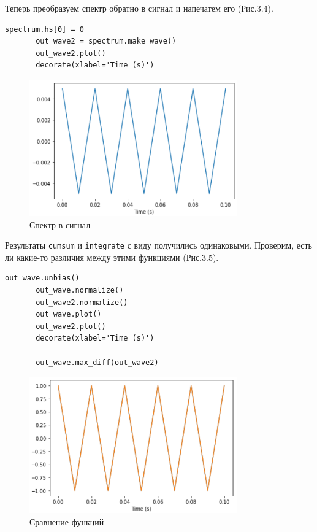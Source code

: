 \documentclass[a4paper,12pt]{report}
\begin{document}
    Теперь преобразуем спектр обратно в сигнал и напечатем его (Рис.3.4).
\begin{lstlisting}[caption=Преобразование спектра в сигнал]
       spectrum.hs[0] = 0
       out_wave2 = spectrum.make_wave()
       out_wave2.plot()
       decorate(xlabel='Time (s)')
\end{lstlisting}
\begin{figure}[H]
        \centering
        \includegraphics[width=0.8\textwidth]{fig3-4.PNG}
        \caption{Спектр в сигнал}
        \label{fig:fig3-4}
\end{figure}   

    Результаты \texttt{cumsum} и \texttt{integrate} с виду получились одинаковыми. Проверим, есть ли какие-то различия между этими функциями (Рис.3.5).
\begin{lstlisting}[caption=Сравнение cumsum и integrate]
       out_wave.unbias()
       out_wave.normalize()
       out_wave2.normalize()
       out_wave.plot()
       out_wave2.plot()
       decorate(xlabel='Time (s)')

       out_wave.max_diff(out_wave2)
\end{lstlisting}
\begin{figure}[H]
        \centering
        \includegraphics[width=0.8\textwidth]{fig3-5.PNG}
        \caption{Сравнение функций}
        \label{fig:fig3-5}
\end{figure} 
\end{document}
